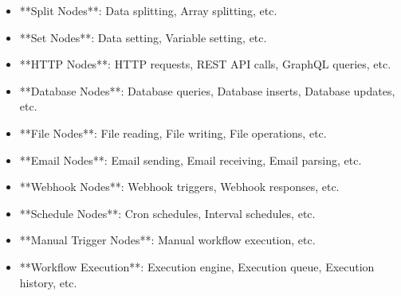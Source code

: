 \documentclass[11pt,a4paper]{article}
\begin{document}
\begin{itemize}
\item **Split Nodes**: Data splitting, Array splitting, etc.
\end{itemize}

\begin{itemize}
\item **Set Nodes**: Data setting, Variable setting, etc.
\end{itemize}

\begin{itemize}
\item **HTTP Nodes**: HTTP requests, REST API calls, GraphQL queries, etc.
\end{itemize}

\begin{itemize}
\item **Database Nodes**: Database queries, Database inserts, Database updates, etc.
\end{itemize}

\begin{itemize}
\item **File Nodes**: File reading, File writing, File operations, etc.
\end{itemize}

\begin{itemize}
\item **Email Nodes**: Email sending, Email receiving, Email parsing, etc.
\end{itemize}

\begin{itemize}
\item **Webhook Nodes**: Webhook triggers, Webhook responses, etc.
\end{itemize}

\begin{itemize}
\item **Schedule Nodes**: Cron schedules, Interval schedules, etc.
\end{itemize}

\begin{itemize}
\item **Manual Trigger Nodes**: Manual workflow execution, etc.
\end{itemize}

\begin{itemize}
\item **Workflow Execution**: Execution engine, Execution queue, Execution history, etc.
\end{itemize}
\end{document}

